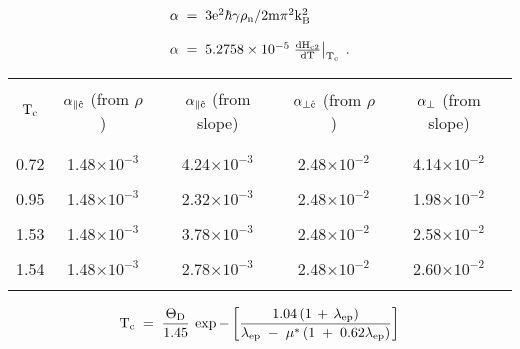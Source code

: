 {\newpage
\clearpage
\samepage \begin{figure}\vspace{5in}

\label{proxeff}
\end{figure}
}

{\newpage
\clearpage
\samepage \begin{equation}%
\label{alphadef}
\begin{array}{l}
\rm \alpha \; = \; 3e^2\hbar \gamma \rho_n/2 m \pi^2 k_B^2 \\ 
\\ 
\rm \alpha \; = \; 5.2758\times10^{-5} \left. \frac{dH_{c2}}{dT}
\right|_{T_c} \; .
\end{array}
\end{equation}
}

{\newpage
\clearpage
\samepage \begin{table}%
\begin{center}
\begin{tabular}{|c|cccc|}
\hline
& & & &  \\ 
$\rm T_c$  & $\rm \alpha_{\parallel \hat{c}}$ (from $\rho$) & $\rm \alpha_{\parallel \hat{c}}$ (from slope) & $\rm \alpha_{\perp \hat{c}}$ (from $\rho$)
& $\rm \alpha_{\perp}$ (from slope) \\ 
& & & &  \\ 
\hline
& & & &  \\ 
0.72\cite{iye82} & 1.48$\times 10^{-3}$ & 4.24$\times 10^{-3}$  & 2.48$\times 10^{-2}$ & 4.14$\times 10^{-2}$\\ 
& & & &  \\ 
0.95 & 1.48$\times 10^{-3}$ & 2.32$\times 10^{-3}$  & 2.48$\times 10^{-2}$ & 1.98$\times 10^{-2}$\\ 
& & & &  \\ 
1.53 & 1.48$\times 10^{-3}$ & 3.78$\times 10^{-3}$  & 2.48$\times 10^{-2}$ & 2.58$\times 10^{-2}$\\ 
& & & &  \\ 
1.54 & 1.48$\times 10^{-3}$ & 2.78$\times 10^{-3}$ & 2.48$\times 10^{-2}$ & 2.60$\times 10^{-2}$\\ 
& & & &  \\ 
\hline
\end{tabular}
\end{center}

\label{alphatable}
\end{table}
}

{\newpage
\clearpage
\samepage \begin{displaymath}\rm T_c \; = \; \frac{\Theta_D}{1.45} \: \exp{-\left[ \frac{1.04 \left( 1
\, + \, \lambda_{ep} \right)}{\lambda_{ep} \; - \; \mu^* \left(1 \; + \; 0.62\lambda_{ep} \right)}  \right]}
\end{displaymath}
}

